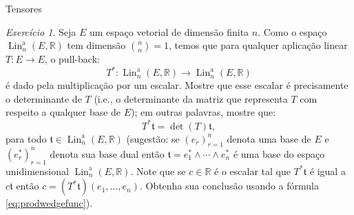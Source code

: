 \documentclass[oneside,11pt]{amsart}
\newcommand{\R}{\mathds R}
\DeclareMathOperator{\Lin}{Lin}
\theoremstyle{remark}\newtheorem{exercise}{Exercício}[section]
\theoremstyle{plain}\newtheorem{teo}{Teorema}[section]
\theoremstyle{plain}\newtheorem{lem}[teo]{Lema}
\theoremstyle{plain}\newtheorem{prop}[teo]{Proposição}
\theoremstyle{definition}\newtheorem{defin}[teo]{Definição}
\theoremstyle{remark}\newtheorem{rem}[teo]{Observação}
\theoremstyle{definition}\newtheorem{example}[teo]{Exemplo}
\numberwithin{equation}{section}
\begin{document}
\begin{section}{Tensores}
\begin{exercise}
Seja $E$ um espaço vetorial de dimensão finita $n$. Como o espaço $\Lin_n^{\mathrm a}(E,\R)$ tem dimensão $\binom nn=1$, temos que para qualquer aplicação
linear $T:E\to E$, o pull-back:
\[T^*:\Lin_n^{\mathrm a}(E,\R)\longrightarrow\Lin_n^{\mathrm a}(E,\R)\]
é dado pela multiplicação por um escalar. Mostre que esse escalar é precisamente o determinante de $T$ (i.e., o determinante da matriz que representa
$T$ com respeito a qualquer base de $E$); em outras palavras, mostre que:
\[T^*\mathfrak t=\det(T)\mathfrak t,\]
para todo $\mathfrak t\in\Lin_n^{\mathrm a}(E,\R)$ (sugestão: se $(e_r)_{r=1}^n$ denota uma base de $E$ e $(e_r^*)_{r=1}^n$ denota sua base dual
então $\mathfrak t=e_1^*\wedge\cdots\wedge e_n^*$ é uma base do espaço unidimensional $\Lin_n^{\mathrm a}(E,\R)$. Note que se $c\in\R$ é o escalar
tal que $T^*\mathfrak t$ é igual a $c\mathfrak t$ então $c=(T^*\mathfrak t)(e_1,\ldots,e_n)$. Obtenha sua conclusão usando a fórmula \eqref{eq:prodwedgefunc}).
\end{exercise}

\end{section}
\end{document}
